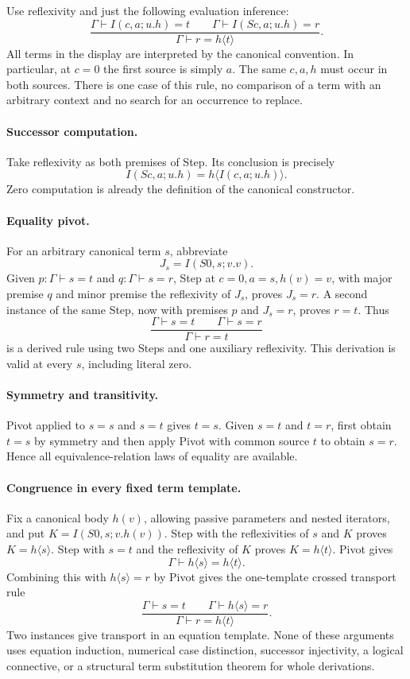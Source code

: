 Use reflexivity and just the following evaluation inference:
\[
 \frac{\Gamma\vdash I(c,a;u.h)=t
       \qquad
       \Gamma\vdash I(Sc,a;u.h)=r}
      {\Gamma\vdash r=h\langle t\rangle}.
 \tag{Step}\label{rule:uniform-step}
\]
All terms in the display are interpreted by the canonical convention.
In particular, at $c=0$ the first source is simply $a$. The same
$c,a,h$ must occur in both sources. There is one case of this rule, no
comparison of a term with an arbitrary context and no search for an
occurrence to replace.

\paragraph{Successor computation.}
Take reflexivity as both premises of Step. Its conclusion is precisely
\[
 I(Sc,a;u.h)=h\langle I(c,a;u.h)\rangle.
 \tag{Succ}
\]
Zero computation is already the definition of the canonical constructor.

\paragraph{Equality pivot.}
For an arbitrary canonical term $s$, abbreviate
\[
 J_s=I(S0,s;v.v).
\]
Given $p:\Gamma\vdash s=t$ and $q:\Gamma\vdash s=r$, Step at
$c=0,a=s,h(v)=v$, with major premise $q$ and minor premise the
reflexivity of $J_s$, proves $J_s=r$. A second instance of the same
Step, now with premises $p$ and $J_s=r$, proves $r=t$. Thus
\[
 \frac{\Gamma\vdash s=t\qquad\Gamma\vdash s=r}
      {\Gamma\vdash r=t}
 \tag{Pivot}\label{rule:pivot}
\]
is a derived rule using two Steps and one auxiliary reflexivity.
This derivation is valid at every $s$, including literal zero.

\paragraph{Symmetry and transitivity.}
Pivot applied to $s=s$ and $s=t$ gives $t=s$. Given $s=t$ and $t=r$,
first obtain $t=s$ by symmetry and then apply Pivot with common source
$t$ to obtain $s=r$. Hence all equivalence-relation laws of equality
are available.

\paragraph{Congruence in every fixed term template.}
Fix a canonical body $h(v)$, allowing passive parameters and nested
iterators, and put $K=I(S0,s;v.h(v))$. Step with the reflexivities of
$s$ and $K$ proves $K=h\langle s\rangle$. Step with $s=t$ and the
reflexivity of $K$ proves $K=h\langle t\rangle$. Pivot gives
\[
 \Gamma\vdash h\langle s\rangle=h\langle t\rangle.
\]
Combining this with $h\langle s\rangle=r$ by Pivot gives the
one-template crossed transport rule
\[
 \frac{\Gamma\vdash s=t\qquad
       \Gamma\vdash h\langle s\rangle=r}
      {\Gamma\vdash r=h\langle t\rangle}.
 \tag{Tr}\label{rule:recovered-tr}
\]
Two instances give transport in an equation template. None of these
arguments uses equation induction, numerical case distinction,
successor injectivity, a logical connective, or a structural term
substitution theorem for whole derivations.

